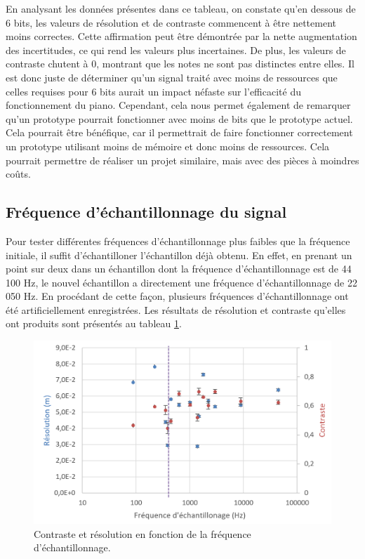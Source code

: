 ﻿\documentclass[11pt,letterpaper]{article}
\begin{document}
En analysant les données présentes dans ce tableau, on constate qu'en dessous de 6 bits,  
les valeurs de résolution et de contraste commencent à être nettement moins correctes.  
Cette affirmation peut être démontrée par la nette augmentation des incertitudes, ce qui  
rend les valeurs plus incertaines. De plus, les valeurs de contraste chutent à 0, montrant que les
notes ne sont pas distinctes entre elles. Il est donc juste de déterminer qu'un signal traité  
avec moins de ressources que celles requises pour 6 bits aurait un impact néfaste sur  
l'efficacité du fonctionnement du piano. Cependant, cela nous permet également de remarquer  
qu'un prototype pourrait fonctionner avec moins de bits que le prototype actuel.  
Cela pourrait être bénéfique, car il permettrait de faire fonctionner correctement un prototype  
utilisant moins de mémoire et donc moins de ressources. Cela pourrait permettre de réaliser un projet 
similaire, mais avec des pièces à moindres coûts. 

\subsection{Fréquence d'échantillonnage du signal}

Pour tester différentes fréquences d'échantillonnage plus faibles que la 
fréquence initiale, il suffit d'échantilloner l'échantillon déjà obtenu. En
effet, en prenant un point sur deux dans un échantillon dont la fréquence
d'échantillonnage est de 44 100 Hz, le nouvel échantillon a directement une
fréquence d'échantillonnage de 22 050 Hz. 
En procédant de cette façon, plusieurs fréquences d'échantillonnage ont été
artificiellement enregistrées. Les résultats de résolution et contraste 
qu'elles ont produits sont présentés au tableau \ref{fs_fig}.

\begin{figure}[H]
    \centering
    \includegraphics[scale=0.55]{graphique_fs.png}
    \caption{Contraste et résolution en fonction de la fréquence d'échantillonnage.}
    \label{fs_fig}
\end{figure}
\end{document}
